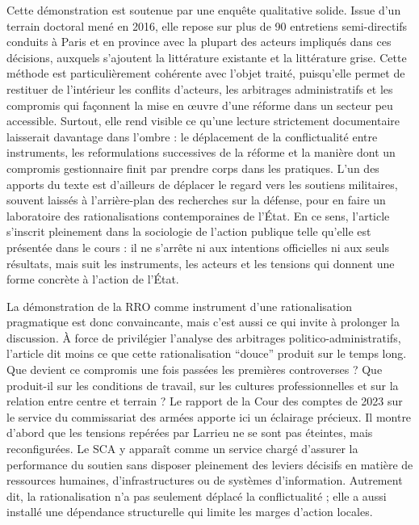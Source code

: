 \documentclass[12pt,a4paper]{article}
\begin{document}
Cette d\'emonstration est soutenue par une enqu\^ete qualitative solide. Issue d'un terrain doctoral men\'e en 2016, elle repose sur plus de 90 entretiens semi-directifs conduits \`a Paris et en province avec la plupart des acteurs impliqu\'es dans ces d\'ecisions, auxquels s'ajoutent la litt\'erature existante et la litt\'erature grise. Cette m\'ethode est particuli\`erement coh\'erente avec l'objet trait\'e, puisqu'elle permet de restituer de l'int\'erieur les conflits d'acteurs, les arbitrages administratifs et les compromis qui fa\c connent la mise en \oe uvre d'une r\'eforme dans un secteur peu accessible. Surtout, elle rend visible ce qu'une lecture strictement documentaire laisserait davantage dans l'ombre : le d\'eplacement de la conflictualit\'e entre instruments, les reformulations successives de la r\'eforme et la mani\`ere dont un compromis gestionnaire finit par prendre corps dans les pratiques. L'un des apports du texte est d'ailleurs de d\'eplacer le regard vers les soutiens militaires, souvent laiss\'es \`a l'arri\`ere-plan des recherches sur la d\'efense, pour en faire un laboratoire des rationalisations contemporaines de l'\'Etat. En ce sens, l'article s'inscrit pleinement dans la sociologie de l'action publique telle qu'elle est pr\'esent\'ee dans le cours : il ne s'arr\^ete ni aux intentions officielles ni aux seuls r\'esultats, mais suit les instruments, les acteurs et les tensions qui donnent une forme concr\`ete \`a l'action de l'\'Etat.

La d\'emonstration de la RRO comme instrument d'une rationalisation pragmatique est donc convaincante, mais c'est aussi ce qui invite \`a prolonger la discussion. \`A force de privil\'egier l'analyse des arbitrages politico-administratifs, l'article dit moins ce que cette rationalisation ``douce'' produit sur le temps long. Que devient ce compromis une fois pass\'ees les premi\`eres controverses ? Que produit-il sur les conditions de travail, sur les cultures professionnelles et sur la relation entre centre et terrain ? Le rapport de la Cour des comptes de 2023 sur le service du commissariat des arm\'ees apporte ici un \'eclairage pr\'ecieux. Il montre d'abord que les tensions rep\'er\'ees par Larrieu ne se sont pas \'eteintes, mais reconfigur\'ees. Le SCA y appara\^it comme un service charg\'e d'assurer la performance du soutien sans disposer pleinement des leviers d\'ecisifs en mati\`ere de ressources humaines, d'infrastructures ou de syst\`emes d'information. Autrement dit, la rationalisation n'a pas seulement d\'eplac\'e la conflictualit\'e ; elle a aussi install\'e une d\'ependance structurelle qui limite les marges d'action locales.
\end{document}
